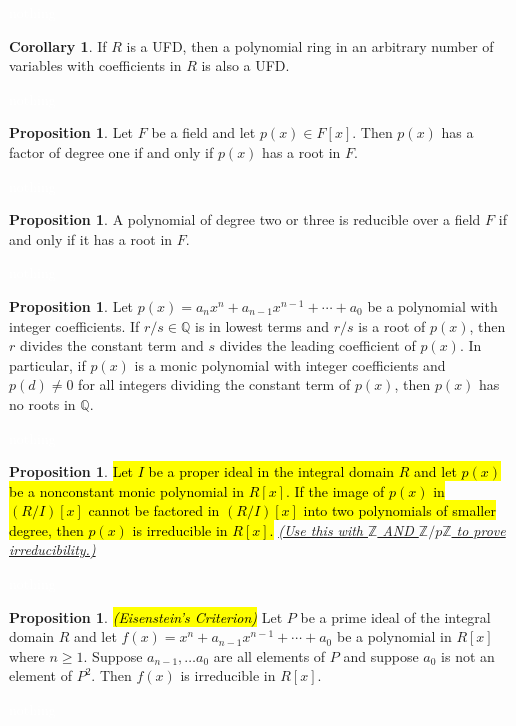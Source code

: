 \documentclass{article}
\theoremstyle{definition}
\newtheorem{prop}[thm]{Proposition}
\newtheorem{cor}[thm]{Corollary}
\newcommand{\nl}{\textcolor{white}{nothing}}
\newcommand{\Q}{\mathbb{Q}}
\newcommand{\Z}{\mathbb{Z}}
\begin{document}
\nl

\begin{cor}
If $R$ is a UFD, then a polynomial ring in an arbitrary number of variables with coefficients in $R$ is also a UFD.
\end{cor}

\nl

\begin{prop}
Let $F$ be a field and let $p(x)\in F[x]$. Then $p(x)$ has a factor of degree one if and only if $p(x)$ has a root in $F$.
\end{prop}

\nl

\begin{prop}
A polynomial of degree two or three is reducible over a field $F$ if and only if it has a root in $F$.
\end{prop}

\nl

\begin{prop}
Let $p(x) = a_nx^n+ a_{n-1}x^{n-1} + \cdots +a_0$ be a polynomial with integer coefficients. If $r/s\in \Q$ is in lowest terms and $r/s$ is a root of $p(x)$, then $r$ divides the constant term and $s$ divides the leading coefficient of $p(x)$. In particular, if $p(x)$ is a monic polynomial with integer coefficients and $p(d) \neq 0$ for all integers dividing the constant term of $p(x)$, then $p(x)$ has no roots in $\Q$.
\end{prop}

\nl

\begin{prop}
\hl{Let $I$ be a proper ideal in the integral domain $R$ and let $p(x)$ be a nonconstant monic polynomial in $R[x]$. If the image of $p(x)$ in $(R/I)[x]$ cannot be factored in $(R/I)[x]$ into two polynomials of smaller degree, then $p(x)$ is irreducible in $R[x]$.} \underline{\textit{(Use this with $\Z$ AND $\Z/p\Z$ to prove irreducibility.)}}
\end{prop} 

\nl

\begin{prop}\hl{\textit{(Eisenstein's Criterion)}}
Let $P$ be a prime ideal of the integral domain $R$ and let $f(x) = x^n + a_{n-1}x^{n-1}+\cdots + a_0$ be a polynomial in $R[x]$ where $n\geq 1$. Suppose $a_{n-1}, \ldots a_0$ are all elements of $P$ and suppose $a_0$ is not an element of $P^2$. Then $f(x)$ is irreducible in $R[x]$.
\end{prop}

\nl
\end{document}
